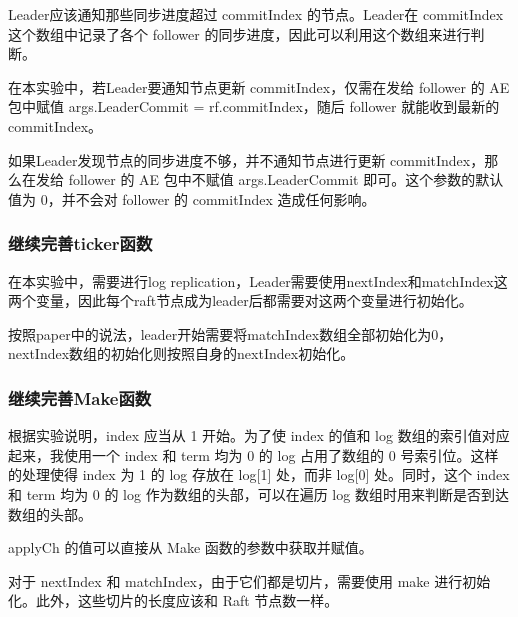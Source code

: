\documentclass[]{article}
\begin{document}
	Leader应该通知那些同步进度超过 commitIndex 的节点。Leader在 commitIndex 这个数组中记录了各个 follower 的同步进度，因此可以利用这个数组来进行判断。
	
	在本实验中，若Leader要通知节点更新 commitIndex，仅需在发给 follower 的 AE 包中赋值 args.LeaderCommit = rf.commitIndex，随后 follower 就能收到最新的 commitIndex。
	
	如果Leader发现节点的同步进度不够，并不通知节点进行更新 commitIndex，那么在发给 follower 的 AE 包中不赋值 args.LeaderCommit 即可。这个参数的默认值为 0，并不会对 follower 的 commitIndex 造成任何影响。
	\subsubsection{继续完善ticker函数}
	在本实验中，需要进行log replication，Leader需要使用nextIndex和matchIndex这两个变量，因此每个raft节点成为leader后都需要对这两个变量进行初始化。
	
	按照paper中的说法，leader开始需要将matchIndex数组全部初始化为0，nextIndex数组的初始化则按照自身的nextIndex初始化。
	\subsubsection{继续完善Make函数}
	根据实验说明，index 应当从 1 开始。为了使 index 的值和 log 数组的索引值对应起来，我使用一个 index 和 term 均为 0 的 log 占用了数组的 0 号索引位。这样的处理使得 index 为 1 的 log 存放在 log[1] 处，而非 log[0] 处。同时，这个 index 和 term 均为 0 的 log 作为数组的头部，可以在遍历 log 数组时用来判断是否到达数组的头部。
	
	applyCh 的值可以直接从 Make 函数的参数中获取并赋值。
	
	对于 nextIndex 和 matchIndex，由于它们都是切片，需要使用 make 进行初始化。此外，这些切片的长度应该和 Raft 节点数一样。
	
\end{document}
